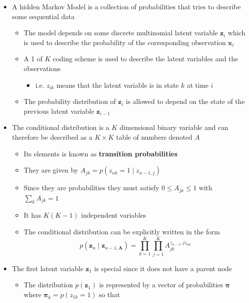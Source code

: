 \documentclass[a4, english]{article}
\begin{document}
\begin{itemize}
	\item A hidden Markov Model is a collection of probabilities that tries to describe some sequential data 
  \begin{itemize}
  	\item The model depends on some discrete multinomial latent variable $\pmb z_i$ which is used to describe the probability of the corresponding observation $\pmb x_i$ 
    \item A 1 of $K$ coding scheme is used to describe the latent variables and the observations 
    \begin{itemize}
    	\item i.e. $z_{ik}$ means that the latent variable is in state $k$ at time $i$ 
    \end{itemize}
    \item The probability distribution of $\pmb z_i$ is allowed to depend on the state of the previous latent variable $\pmb z_{i-1}$ 
  \end{itemize}
  \item The conditional distribution is a $K$ dimensional binary variable and can therefore be described as a $K \times K$ table of numbers denoted $A$    
  \begin{itemize}
  	\item Its elements is known as \textbf{transition probabilities}
    \item They are given by $A_{jk} = p(z_{nk} = 1 \mid z_{n-1,j})$
    \item Since they are probabilities they must satisfy $0 \leq A_{jk} \leq 1$ with $\sum_k A_{jk} = 1$
    \item It has $K(K-1)$ independent variables 
    \item The conditional distribution can be explicitly written in the form
    \begin{equation*}
      p(\pmb z_n \mid \pmb z_{n-1, \pmb A}) = \prod_{k=1}^K \prod_{j=1}^K A_{jk}^{z_{n-1},jz_{nk}}
    \end{equation*}
  \end{itemize}
  \item The first latent variable $\pmb z_1$ is special since it does not have a parent node
  \begin{itemize}
    \item The distribution $p(\pmb z_1)$ is represented by a vector of probabilities $\pmb \pi$ where $\pmb \pi_k = p(z_{1k} = 1)$ so that 
    \begin{equation*}

\end{equation*}
\end{itemize}
\end{itemize}
\end{document}
